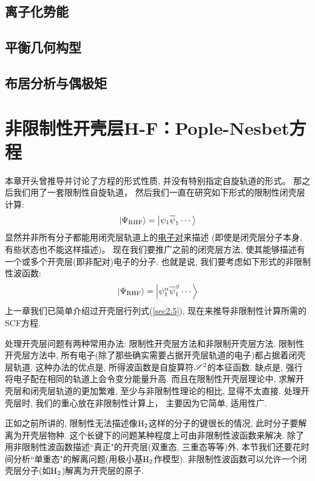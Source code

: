 \subsection{离子化势能}
\subsection{平衡几何构型}
\subsection{布居分析与偶极矩}

\section{非限制性开壳层H-F：Pople-Nesbet方程}
本章开头曾推导并讨论了\hft 方程的形式性质, 
并没有特别指定自旋轨道的形式。 
那之后我们用了一套限制性自旋轨道， 
然后我们一直在研究如下形式的限制性闭壳层计算:
\begin{align}
	\Ket{\Psi_\mathrm{RHF}} = \Ket{\psi_1\overline{\psi}_1\cdots}
\end{align}
显然并非所有分子都能用闭壳层轨道上的\underline{电子对}来描述
(即使是闭壳层分子本身, 有些状态也不能这样描述)。
现在我们要推广之前的闭壳层方法, 
使其能够描述有一个或多个开壳层(即非配对)电子的分子. 
也就是说, 
我们要考虑如下形式的非限制性波函数:
\begin{align}
	\Ket{\Psi_\mathrm{RHF}} = \Ket{\psi_1^\alpha\overline{\psi}_1^\beta\cdots}
\end{align}
上一章我们已简单介绍过开壳层行列式(\ref{sec2.5}), 
现在来推导非限制性计算所需的SCF方程.


处理开壳层问题有两种常用办法: 限制性开壳层\hft 方法和非限制开壳层\hft 方法. 
限制性开壳层方法中, 
所有电子(除了那些确实需要占据开壳层轨道的电子)都占据着闭壳层轨道. 
这种办法的优点是, 
所得波函数是自旋算符$\mathscr{S}^2$的本征函数. 
缺点是, 
强行将电子配在相同的轨道上会令变分能量升高. 
而且在限制性开壳层\hft 理论中, 
求解开壳层和闭壳层轨道的更加繁难, 
至少与非限制性\hft 理论的相比, 
显得不太直接. 
处理开壳层时, 
我们的重心放在非限制性计算上， 
主要因为它简单, 
适用性广.


正如之前所讲的, 
限制性\hft  无法描述像$\mathrm{H}_2$这样的分子的键很长的情况, 
此时分子要解离为开壳层物种. 
这个长键下的问题某种程度上可由非限制性波函数来解决. 
除了用非限制性波函数描述``真正"的开壳层(双重态, 
三重态等等)外, 
本节我们还要花时间分析``单重态"的解离问题(用极小基$\mathrm{H}_2$作模型). 
非限制性波函数可以允许一个闭壳层分子(如$\mathrm{H}_2$)解离为开壳层的原子.


